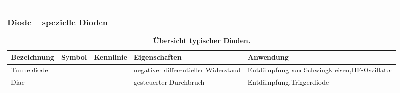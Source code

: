 \begin{frame}
    \b{
        \frametitle{Diode -- spezielle Dioden}
        \begin{table}[H]
            \centering 
            \begin{tabular}{ |p{2.1cm}|p{1.4cm}|p{3.2cm}|p{2.8cm}|p{3cm}| }
                \hline
                \textbf{Bezeichnung} & \textbf{Symbol} & \textbf{Kennlinie} & \textbf{Eigenschaften} & \textbf{Anwendung} \\
                \hline
                Tunnel\-diode
                &
                \begin{minipage}[t][2.6cm][c]{1.4cm}
                    \centering 
                \end{minipage}
                & 
                \begin{minipage}[t][2.6cm][c]{3.3cm}
                    \centering 
                \end{minipage}
                & 
                negativer differentieller Widerstand &
                Entdämpfung von Schwingkreisen,\newline HF-Oszillator\\
                \hline
                Diac
                &
                \begin{minipage}[t][2.6cm][c]{1.4cm}
                    \centering 
                \end{minipage}
                & 
                \begin{minipage}[t][2.6cm][c]{3.3cm}
                    \centering 
                \end{minipage}
                & 
                gesteuerter Durchbruch & 
                Entdämpfung,\newline Triggerdiode\\
                \hline
        \end{tabular}
        \caption{\textbf{Übersicht typischer Dioden.}}
    \end{table}
    }

\end{frame}

